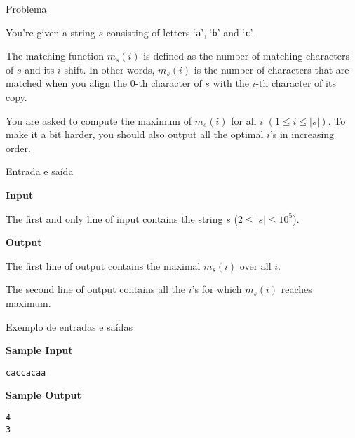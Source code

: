 
\begin{frame}[fragile]{Problema}

You're given a string $s$ consisting of letters `\texttt{a}', `\texttt{b}' and `\texttt{c}'.

The matching function $m_s(i)$ is defined as the number of matching characters of $s$ and its
$i$-shift. In other words, $m_s(i)$ is the number of characters that are matched when you align the
0-th character of $s$ with the $i$-th character of its copy.

You are asked to compute the maximum of $m_s(i)$ for all $i$ $(1\leq i\leq |s|)$. To make it a bit
harder, you should also output all the optimal $i$'s in increasing order.

\end{frame}

\begin{frame}[fragile]{Entrada e saída}

\textbf{Input}

The first and only line of input contains the string $s$ ($2\leq |s| \leq 10^5$).

\vspace{0.2in}

\textbf{Output}

The first line of output contains the maximal $m_s(i)$ over all $i$.

The second line of output contains all the $i$'s for which $m_s(i)$ reaches maximum.

\end{frame}

\begin{frame}[fragile]{Exemplo de entradas e saídas}

\begin{minipage}[t]{0.45\textwidth}
\textbf{Sample Input}
\begin{verbatim}
caccacaa
\end{verbatim}
\end{minipage}
\begin{minipage}[t]{0.5\textwidth}
\textbf{Sample Output}
\begin{verbatim}
4
3
\end{verbatim}
\end{minipage}
\end{frame}

